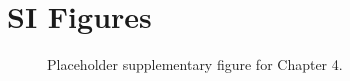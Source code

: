 \section{SI Figures}

\begin{figure}[htbp]
  \caption{Placeholder supplementary figure for Chapter 4.}
  \label{fig:ch4-si-fig1}
\end{figure}

